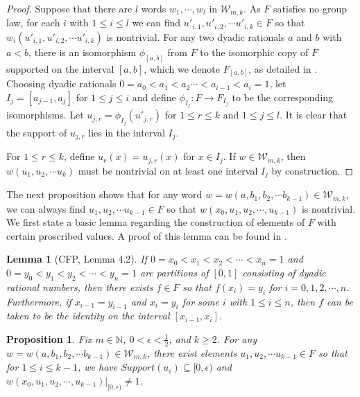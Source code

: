 \documentclass[11pt]{amsart}
\newtheorem{proposition}[theorem]{Proposition}
\newtheorem{lemma}[theorem]{Lemma}
\begin{document}
\begin{proof}
Suppose that there are $l$ words $w_1, \cdots ,w_l$ in ${{\mathcal W}_{m,k}}$.  As
$F$ satisfies no group law, for each $i$ with $1 \leq i \leq l$ we
can find $u'_{i,1}, u'_{i,2}, \cdots u'_{i,k} \in F$ so that
$w_i(u'_{i,1}, u'_{i,2}, \cdots u'_{i,k} )$ is nontrivial. For any
two dyadic rationals $a$ and $b$ with $a<b$, there is an
isomorphism $\phi_{[a,b]}$ from $F$ to the isomorphic copy of $F$
supported on the interval $[a,b]$, which we denote
$F_{[a,b]}$, as detailed in \cite{BiSt}. Choosing dyadic rationals $0=a_0<a_1<a_2 \cdots
<a_{i-1}<a_i=1$, let $I_j=[a_{j-1},a_j]$ for $1 \leq j \leq
i$ and define $\phi_{I_j}:F \rightarrow F_{I_j}$ to be the corresponding
isomorphisms.  Let $u_{j,r} = \phi_{I_j}(u'_{j,r})$ for $1 \leq r
\leq k$ and $1 \leq j \leq l$. It is clear that the support of
$u_{j,r}$ lies in the interval $I_j$.

For $1 \leq r \leq k$, define $u_r(x) = u_{j,r}(x)$ for $x \in
I_j$.  If $w \in {{\mathcal W}_{m,k}}$, then $w(u_1, u_2, \cdots u_{k})$ must be
nontrivial on at least one interval $I_j$ by construction.
\end{proof}

The next proposition shows that for any word $w=w(a,b_1,b_2,
\cdots b_{k-1}) \in {{\mathcal W}_{m,k}}$, we can always find $u_1,u_2, \cdots
u_{k-1} \in F$ so that $w(x_0,u_1,u_2, \cdots ,u_{k-1})$ is
nontrivial. We first state a basic lemma regarding the
construction of elements of $F$ with certain proscribed values.  A
proof of this lemma can be found in \cite{CFP}.

\begin{lemma}[\lbrack CFP\rbrack, Lemma 4.2]\label{lemma:dyadic-list}
If $0=x_0 < x_1 < x_2 < \cdots < x_n = 1$ and $0=y_0 < y_1 < y_2 <
\cdots < y_n = 1$ are partitions of $[0,1]$ consisting of dyadic
rational numbers,  then there exists $f \in F$ so that $f(x_i) =
y_i$ for $i=0,1,2, \cdots ,n$.  Furthermore, if $x_{i-1} =
y_{i-1}$ and $x_i = y_i$ for some $i$ with $1 \leq i \leq n$, then
$f$ can be taken to be the identity on the interval
$[x_{i-1},x_i]$.
\end{lemma}

\begin{proposition}
\label{prop:x0-u-substitution} Fix $m \in {\mathbb N}$, $0<\epsilon < \frac{1}{2}$, and $k \geq 2$.
For any $w=w(a,b_1,b_2, \cdots b_{k-1}) \in {{\mathcal W}_{m,k}}$, there exist elements
$u_1,u_2, \cdots u_{k-1} \in F$ so that for $1 \leq i \leq k-1$, we have $Support(u_i) \subseteq [0, \epsilon )$ and $w(x_0,u_1,u_2, \cdots
,u_{k-1})|_{[0, \epsilon)}\neq 1$.
\end{proposition}
\end{document}
